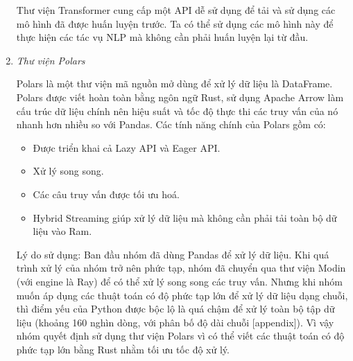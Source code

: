 \begin{enumerate}
          Thư viện Transformer cung cấp một API dễ sử dụng để tải và sử dụng các mô hình đã được huấn luyện trước. Ta có thể sử dụng các mô hình này để thực hiện các tác vụ NLP mà không cần phải huấn luyện lại từ đầu.

    \item \textit{Thư viện Polars}

          Polars là một thư viện mã nguồn mở dùng để xử lý dữ liệu là DataFrame. Polars được viết hoàn toàn bằng ngôn ngữ Rust, sử dụng Apache Arrow làm cấu trúc dữ liệu chính nên hiệu suất và tốc độ thực thi các truy vấn của nó nhanh hơn nhiều so với Pandas. Các tính năng chính của Polars gồm có:
          \begin{itemize}
              \item Được triển khai cả Lazy API và Eager API.
              \item Xử lý song song.
              \item Các câu truy vấn được tối ưu hoá.
              \item Hybrid Streaming giúp xử lý dữ liệu mà không cần phải tải toàn bộ dữ liệu vào Ram.
          \end{itemize}
          Lý do sử dụng: Ban đầu nhóm đã dùng Pandas để xử lý dữ liệu. Khi quá trình xử lý của nhóm trở nên phức tạp, nhóm đã chuyển qua thư viện Modin (với engine là Ray) để có thể xử lý song song các truy vấn. Nhưng khi nhóm muốn áp dụng các thuật toán có độ phức tạp lớn để xử lý dữ liệu dạng chuỗi, thì điểm yếu của Python được bộc lộ là quá chậm để xử lý toàn bộ tập dữ liệu (khoảng 160 nghìn dòng, với phân bố độ dài chuỗi [appendix]). Vì vậy nhóm quyết định sử dụng thư viện Polars vì có thể viết các thuật toán có độ phức tạp lớn bằng Rust nhằm tối ưu tốc độ xử lý.
\end{enumerate}

